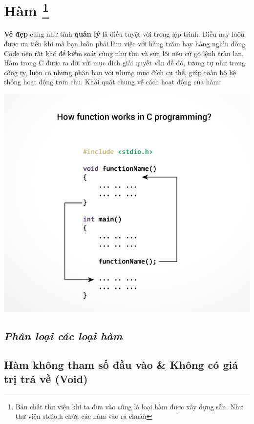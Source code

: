 \documentclass[12pt,a4paper]{article}
\begin{document}
\section{Hàm \footnote{Bản chất thư viện khi ta đưa vào cũng là loại hàm được xây dựng sẵn. Như thư viện stdio.h chứa các hàm vào ra chuẩn }}
 \textbf{Vẻ đẹp} cũng như tính \textbf{quản lý} là điều tuyệt vời trong lập trình. Điều này luôn được ưu tiên khi mà bạn luôn phải làm việc với hàng trăm hay hàng nghìn dòng Code nên rất khó để kiểm soát cũng như tìm và sửa lỗi nếu cứ gõ lệnh tràn lan. Hàm trong C được ra đời với mục đích giải quyết vấn đề đó, tương tự như trong công ty, luôn có những phân ban với những mục đích cụ thể, giúp toàn bộ hệ thống hoạt động trơn chu. Khái quát chung về cách hoạt động của hàm: 
\begin{center}
	\includegraphics[scale = 0.4]{functionwork}
\end{center}
\begin{center}
\subsection*{\textit{Phân loại các loại hàm}} 	
\end{center}

\subsection{Hàm không tham số đầu vào \& Không có giá trị trả về (Void)}
\end{document}
